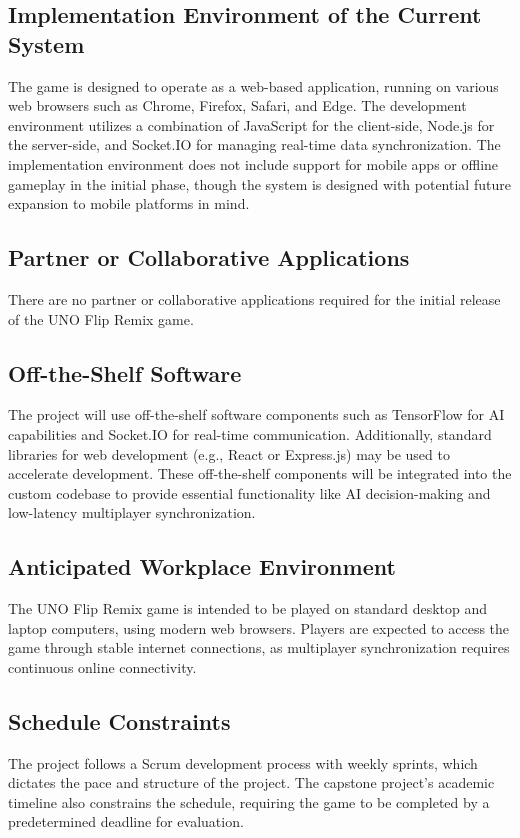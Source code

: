 \documentclass{article}
\begin{document}
\subsection{Implementation Environment of the Current System}
The game is designed to operate as a web-based application, running on various web browsers such as Chrome, Firefox, Safari, and Edge. The development environment utilizes a combination of JavaScript for the client-side, Node.js for the server-side, and Socket.IO for managing real-time data synchronization. The implementation environment does not include support for mobile apps or offline gameplay in the initial phase, though the system is designed with potential future expansion to mobile platforms in mind.

\subsection{Partner or Collaborative Applications}
There are no partner or collaborative applications required for the initial release of the UNO Flip Remix game.

\subsection{Off-the-Shelf Software}
The project will use off-the-shelf software components such as TensorFlow for AI capabilities and Socket.IO for real-time communication. Additionally, standard libraries for web development (e.g., React or Express.js) may be used to accelerate development. These off-the-shelf components will be integrated into the custom codebase to provide essential functionality like AI decision-making and low-latency multiplayer synchronization.

\subsection{Anticipated Workplace Environment}
The UNO Flip Remix game is intended to be played on standard desktop and laptop computers, using modern web browsers. Players are expected to access the game through stable internet connections, as multiplayer synchronization requires continuous online connectivity.

\subsection{Schedule Constraints}
The project follows a Scrum development process with weekly sprints, which dictates the pace and structure of the project. The capstone project's academic timeline also constrains the schedule, requiring the game to be completed by a predetermined deadline for evaluation.
\end{document}
